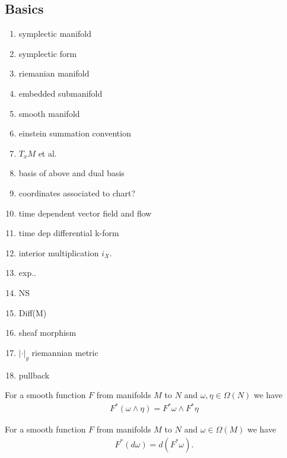 \begin{appendix}

\section{Basics}

\begin{enumerate}
\item symplectic manifold
\item symplectic form
\item riemanian manifold
\item embedded submanifold
\item smooth manifold
\item einstein summation convention
\item $T_x M$ et al.
\item basis of above and dual basis
\item coordinates associated to chart?
\item time dependent vector field and flow
\item time dep differential k-form
\item interior multiplication $i_X$.
\item exp..
\item NS
\item Diff(M)
\item sheaf morphism
\item $|\cdot |_g$ riemannian metric
\item pullback
\end{enumerate}


\begin{lemma}[refyan E.]
For a smooth function $F$ from manifolds $M$ to $N$ and $\omega,\eta \in \Omega(N)$ we have
\begin{align*}
F^*(\omega \wedge \eta) = F^* \omega \wedge F^* \eta
\end{align*}
\end{lemma}

\begin{lemma}[refyan E.203]
For a smooth function $F$ from manifolds $M$ to $N$ and $\omega \in \Omega(M)$ we have
\begin{align*}
F^*(d\omega) = d(F^* \omega).
\end{align*}
\end{lemma}


\end{appendix}

